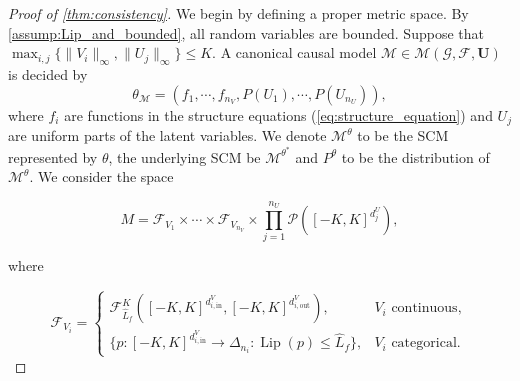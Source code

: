 \begin{proof}[Proof of \cref{thm:consistency}]\label{proof:consistency}
We begin by defining a  proper metric space. By \cref{assump:Lip_and_bounded}, all random variables are bounded. Suppose that $ \max_{i,j}\{\| V_{i} \| _{\infty} ,\| U_{j} \| _{\infty}\} \leqslant K$. A canonical causal model $ \mathcal{M} \in \mathcal{M}(\mathcal{G} ,\mathcal{F} ,\boldsymbol{U})$ is decided by 
\begin{equation*}
\theta _{\mathcal{M}} =( f_{1} ,\cdots ,f_{n_{V}} ,{P}({U_{1}}) ,\cdots , {P}({U_{n_{U}}})) ,
\end{equation*}
where $ f_{i}$ are functions in the structure equations (\ref{eq:structure_equation}) and $ U_{j}$ are uniform parts of the latent variables. We denote $ \mathcal{M}^{\theta }$ to be the SCM represented by $ \theta $, the underlying SCM be $ \mathcal{M}^{\theta^*}$ and $P^\theta$  to be the distribution of $ \mathcal{M}^\theta$. We consider the space

\[
M=\mathcal F_{V_1}\times\cdots\times\mathcal F_{V_{n_V}}\times\prod_{j=1}^{n_U}\mathcal P([-K,K]^{d_j^U}),
\]

where

\[
\mathcal F_{V_i}=\begin{cases}
\mathcal F_{\hat L_f}^K([-K,K]^{d_{i,\text{in}}^V},[-K,K]^{d_{i,\text{out}}^V}),&V_i\text{ continuous},\\
\{p:[-K,K]^{d_{i,\text{in}}^V}\rightarrow\Delta_{n_i}:\operatorname{Lip}(p)\leqslant\hat L_f\},&V_i\text{ categorical}.
\end{cases}
\]


\end{proof}
